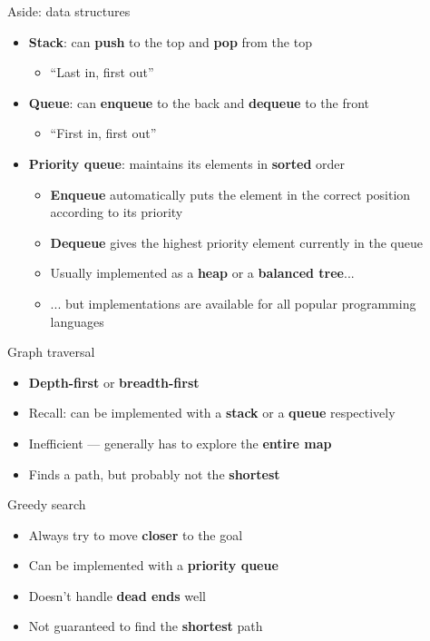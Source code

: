 \begin{frame}{Aside: data structures}
	\begin{itemize}
		\pause\item \textbf{Stack}: can \textbf{push} to the top and \textbf{pop} from the top
			\begin{itemize}
				\pause\item ``Last in, first out''
			\end{itemize}
		\pause\item \textbf{Queue}: can \textbf{enqueue} to the back and \textbf{dequeue} to the front
			\begin{itemize}
				\pause\item ``First in, first out''
			\end{itemize}
		\pause\item \textbf{Priority queue}: maintains its elements in \textbf{sorted} order
			\begin{itemize}
				\pause\item \textbf{Enqueue} automatically puts the element in the correct position according to its priority
				\pause\item \textbf{Dequeue} gives the highest priority element currently in the queue
				\pause\item Usually implemented as a \textbf{heap} or a \textbf{balanced tree}...
				\pause\item ... but implementations are available for all popular programming languages
			\end{itemize}
	\end{itemize}
\end{frame}

\begin{frame}{Graph traversal}
	\begin{itemize}
		\pause\item \textbf{Depth-first} or \textbf{breadth-first}
		\pause\item Recall: can be implemented with a \textbf{stack} or a \textbf{queue} respectively
		\pause\item Inefficient --- generally has to explore the \textbf{entire map}
		\pause\item Finds a path, but probably not the \textbf{shortest}
	\end{itemize}
\end{frame}

\begin{frame}{Greedy search}
	\begin{itemize}
		\pause\item Always try to move \textbf{closer} to the goal
		\pause\item Can be implemented with a \textbf{priority queue}
		\pause\item Doesn't handle \textbf{dead ends} well
		\pause\item Not guaranteed to find the \textbf{shortest} path
	\end{itemize}
\end{frame}

